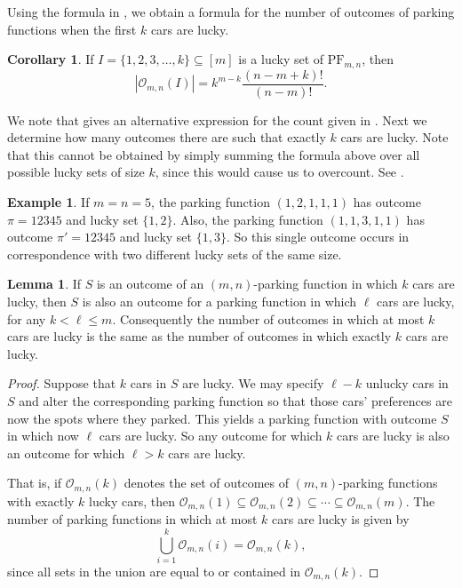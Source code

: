 \documentclass[reqno]{amsart}
\newcommand{\PF}{\mathrm{PF}}
\theoremstyle{definition}
\newtheorem{corollary}{Corollary}[theorem]
\newtheorem{example}[theorem]{Example}
\newtheorem{lemma}[theorem]{Lemma}
\theoremstyle{remark}
\newcommand{\out}{\mathcal{O}}
\begin{document}
Using the formula in , we obtain a formula for the number of outcomes of parking functions when the first $k$ cars are lucky. 
\begin{corollary}\label{cor:again}
If $I = \{1, 2, 3, \ldots, k\}\subseteq[m]$ is a lucky set of $\PF_{m,n}$, then
\[
|\out_{m,n}(I)| = k^{m-k}\frac{(n-m+k)!}{(n-m)!}.
\]
\end{corollary}
We note that  gives an alternative expression for the count given in \cite[Theorem 3.4]{harrismartinez}.
Next we determine how many outcomes there are such that exactly $k$ cars are lucky. Note that this cannot be obtained by simply summing the formula above over all possible lucky sets of size $k$, since this would cause us to overcount. See .

\begin{example}\label{ex:two lucky set one outcome}
If $m=n=5$, the parking function $(1,2,1,1,1)$ has outcome $\pi=12345$ and lucky set $\{1,2\}$.  Also, the parking function $(1,1,3,1,1)$ has outcome $\pi'=12345$ and lucky set $\{1,3\}$. So this single outcome occurs in correspondence with two different lucky sets of the same size.
\end{example}

\begin{lemma}
If $S$ is an outcome of an $(m,n)$-parking function in which $k$ cars are lucky, then $S$ is also an outcome for a parking function in which $\ell$ cars are lucky, for any $k<\ell\leq m$. Consequently the number of outcomes in which at most $k$ cars are lucky is the same as the number of outcomes in which exactly $k$ cars are lucky.
\end{lemma}
\begin{proof}
Suppose that $k$ cars in $S$ are lucky. We may specify $\ell -k$ unlucky cars in $S$ and alter the corresponding parking function so that those cars' preferences are now the spots where they parked. This yields a parking function with outcome $S$ in which now $\ell$ cars are lucky. So any outcome for which $k$ cars are lucky is also an outcome for which $\ell>k$ cars are lucky. 
    
That is, if $\out_{m,n}(k)$ denotes the set of outcomes of $(m,n)$-parking functions with exactly $k$ lucky cars, then $\out_{m,n}(1) \subseteq \out_{m,n}(2) \subseteq \cdots \subseteq \out_{m,n}(m)$. The number of parking functions in which at most $k$ cars are lucky is given by
\[
\bigcup_{i=1}^k \out_{m,n}(i) = \out_{m,n}(k),
\]
since all sets in the union are equal to or contained in $\out_{m,n}(k)$.
\end{proof}
\end{document}
